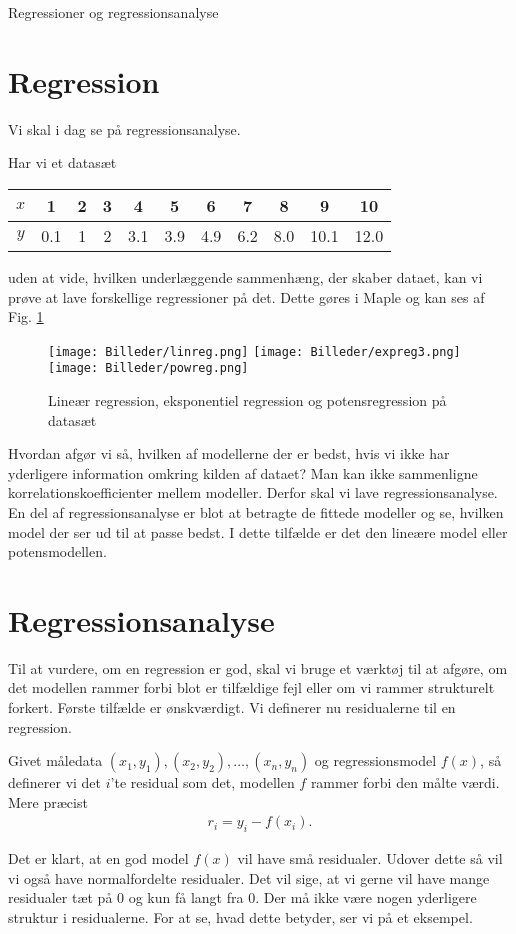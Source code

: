 
\begin{center}
\Huge
Regressioner og regressionsanalyse
\end{center}
\section*{Regression}
Vi skal i dag se på regressionsanalyse.

\begin{exa}
Har vi et datasæt 
\begin{center}
\begin{tabular}{c|c|c|c|c|c|c|c|c|c|c}
$x$ & 1 & 2 & 3 & 4 & 5 & 6 & 7 & 8 & 9 & 10 \\ \hline
$y$ & 0.1 & 1 & 2 & 3.1 & 3.9 & 4.9 & 6.2 & 8.0 & 10.1 & 12.0
\end{tabular}
\end{center}
uden at vide, hvilken underlæggende sammenhæng, der skaber dataet, kan vi prøve at lave forskellige regressioner på det. Dette gøres i Maple og kan ses af Fig. \ref{fig:regression}

\begin{figure}[H]
\centering
\texttt{[image: Billeder/linreg.png]}
\texttt{[image: Billeder/expreg3.png]}
\texttt{[image: Billeder/powreg.png]}
\caption{Lineær regression, eksponentiel regression og potensregression på datasæt}
\label{fig:regression}
\end{figure}
Hvordan afgør vi så, hvilken af modellerne der er bedst, hvis vi ikke har yderligere information omkring kilden af dataet? Man kan ikke sammenligne korrelationskoefficienter mellem modeller. Derfor skal vi lave regressionsanalyse. En del af regressionsanalyse er blot at betragte de fittede modeller og se, hvilken model der ser ud til at passe bedst. I dette tilfælde er det den lineære model eller potensmodellen. 
\end{exa}


\section*{Regressionsanalyse}

Til at vurdere, om en regression er god, skal vi bruge et værktøj til at afgøre, om det modellen rammer forbi blot er tilfældige fejl eller om vi rammer strukturelt forkert. Første tilfælde er ønskværdigt. Vi definerer nu residualerne til en regression.
\begin{defn}
Givet måledata $(x_1,y_1),(x_2,y_2),\hdots,(x_n,y_n)$ og regressionsmodel $f(x)$, så definerer vi det $i$'te residual som det, modellen $f$ rammer forbi den målte værdi. Mere præcist
\begin{align*}
r_i = y_i - f(x_i).
\end{align*} 
\end{defn}
Det er klart, at en god model $f(x)$ vil have små residualer. Udover dette så vil vi også have normalfordelte residualer. Det vil sige, at vi gerne vil have mange residualer tæt på 0 og kun få langt fra 0. Der må ikke være nogen yderligere struktur i residualerne. For at se, hvad dette betyder, ser vi på et eksempel.

